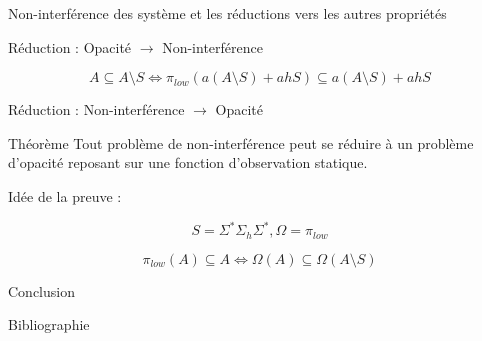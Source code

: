 \documentclass[11pt]{beamer}
\begin{document}
\begin{section}{Non-interf\'erence des syst\`eme et les r\'eductions vers les autres propri\'et\'es}
\begin{frame}{R\'eduction : Opacit\'e $\to$ Non-interf\'erence}
\begin{figure}[H]
\begin{tikzpicture}
  \end{tikzpicture}
\end{figure}

$$A \subseteq A\setminus S \iff \pi_{low}(a(A\setminus S) + a h S)\subseteq a(A\setminus S) + a h S$$
\end{frame}

\begin{frame}{R\'eduction : Non-interf\'erence $\to$ Opacit\'e}
\begin{beamerlikethm}{Th\'eor\`eme {\cite[page 5]{BryansKMR08}}}
Tout probl\`eme de non-interf\'erence peut se r\'eduire \`a un probl\`eme d'opacit\'e reposant sur une fonction d'observation statique.
\end{beamerlikethm}

Id\'ee de la preuve :

$$S=\Sigma^*\Sigma_h\Sigma^*, \Omega = \pi_{low}$$

$$\pi_{low}(A) \subseteq A \iff \Omega(A) \subseteq \Omega(A \setminus S)$$
\end{frame}

\end{section}


\begin{section}{Conclusion}
 
\end{section}

\begin{frame}{Bibliographie}

\end{frame}
\end{document}
